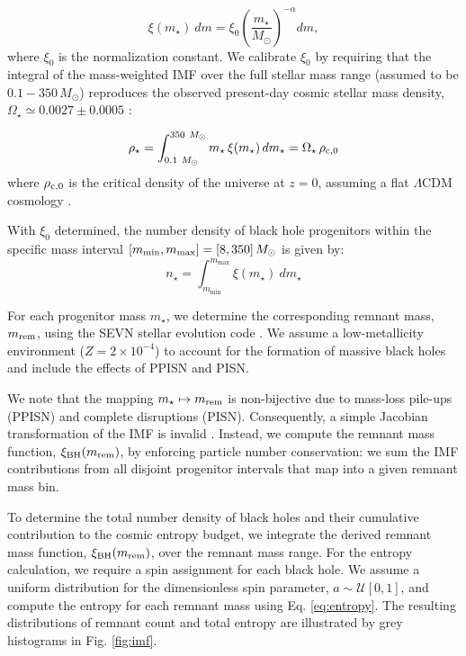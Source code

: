 \documentclass[twocolumn]{aastex631}
\begin{document}
\begin{equation}
\xi(m_\star)~dm = \xi_0 \left( \frac{m_\star}{M_\odot} \right)^{-\alpha} dm,
\end{equation}
where $\xi_0$ is the normalization constant. We calibrate $\xi_0$ by requiring that the integral of the mass-weighted IMF over the full stellar mass range (assumed to be $0.1 - 350\,M_\odot$) reproduces the observed present-day cosmic stellar mass density, $\Omega_\star \simeq 0.0027\pm0.0005$ \citep{Fukugita_2004, Madau_2014}:

\begin{equation}
  \rho_\star = \int^{350~M_\odot}_{0.1~M_\odot} m_\star\,\xi(m_\star)\,dm_\star = \Omega_\star\,\rho_{\rm c,0}
\end{equation}
where $\rho_{\rm c,0}$ is the critical density of the universe at $z=0$, assuming a flat $\Lambda$CDM cosmology \citep{2020A&A...641A...6P}.

With $\xi_0$ determined, the number density of black hole progenitors within the specific mass interval $[m_{\rm min}, m_{\rm max}] = [8, 350]\,M_\odot$ is given by:
\begin{equation}
    n_\star = \int^{m_\mathrm{max}}_{m_\mathrm{min}} \xi(m_\star)~dm_\star
    \label{eq:numberimfstars}
\end{equation}

For each progenitor mass $m_\star$, we determine the corresponding remnant mass, $m_{\rm rem}$, using the SEVN stellar evolution code \citep{Spera_2017}. We assume a low-metallicity environment ($Z=2\times10^{-4}$) to account for the formation of massive black holes and include the effects of PPISN and PISN.

We note that the mapping $m_\star \mapsto m_{\rm rem}$ is non-bijective due to mass-loss pile-ups (PPISN) and complete disruptions (PISN). Consequently, a simple Jacobian transformation of the IMF is invalid \citep{Jani_2020}. Instead, we compute the remnant mass function, $\xi_{\rm BH}(m_{\rm rem})$, by enforcing particle number conservation: we sum the IMF contributions from all disjoint progenitor intervals that map into a given remnant mass bin.

To determine the total number density of black holes and their cumulative contribution to the cosmic entropy budget, we integrate the derived remnant mass function, $\xi_{\rm BH}(m_{\rm rem})$, over the remnant mass range. For the entropy calculation, we require a spin assignment for each black hole. We assume a uniform distribution for the dimensionless spin parameter, $a \sim \mathcal{U}[0,1]$, and compute the entropy for each remnant mass using Eq. \ref{eq:entropy}. The resulting distributions of remnant count and total entropy are illustrated by grey histograms in Fig. \ref{fig:imf}.
\end{document}
